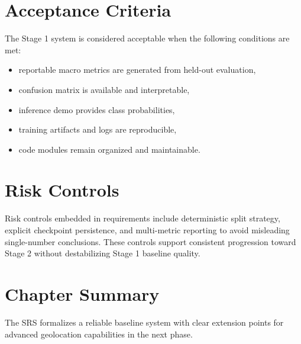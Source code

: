 \section{Acceptance Criteria}
The Stage 1 system is considered acceptable when the following conditions are met:
\begin{itemize}
\item reportable macro metrics are generated from held-out evaluation,
\item confusion matrix is available and interpretable,
\item inference demo provides class probabilities,
\item training artifacts and logs are reproducible,
\item code modules remain organized and maintainable.
\end{itemize}

\section{Risk Controls}
Risk controls embedded in requirements include deterministic split strategy, explicit checkpoint persistence, and multi-metric reporting to avoid misleading single-number conclusions. These controls support consistent progression toward Stage 2 without destabilizing Stage 1 baseline quality.

\section{Chapter Summary}
The SRS formalizes a reliable baseline system with clear extension points for advanced geolocation capabilities in the next phase.


